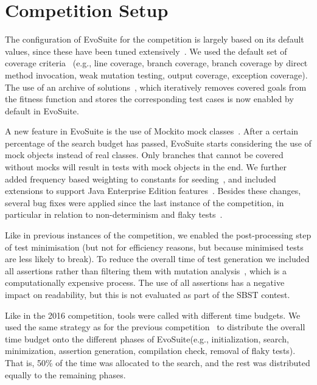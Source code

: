 \documentclass[10pt,conference]{IEEEtran}
\newcommand{\EVOSUITE}{{\sc EvoSuite}\xspace}
\begin{document}
\section{Competition Setup}

The configuration of \EVOSUITE for the competition is largely based on
its default values, since these have been tuned
extensively~\cite{arcuri2013parameter}. We used the default set of
coverage criteria~\cite{rojas2015combining} (e.g., line coverage,
branch coverage, branch coverage by direct method invocation, weak
mutation testing, output coverage, exception coverage). The use of an
archive of solutions~\cite{emse_archive}, which iteratively removes
covered goals from the fitness function and stores the corresponding
test cases is now enabled by default in \EVOSUITE.

A new feature in \EVOSUITE is the use of Mockito mock
classes~\cite{ICST_Mocking17}. After a certain percentage of the
search budget has passed, \EVOSUITE starts considering the use of mock
objects instead of real classes. Only branches that cannot be covered
without mocks will result in tests with mock objects in the end. We
further added frequency based weighting to constants for
seeding~\cite{sakti2015instance}, and included extensions to support
Java Enterprise Edition features~\cite{arcuri2016java}. Besides these
changes, several bug fixes were applied since the last instance of the
competition, in particular in relation to non-determinism and flaky
tests~\cite{ase14_environment}.

Like in previous instances of the competition, we enabled the
post-processing step of test minimisation (but not for efficiency
reasons, but because minimised tests are less likely to break). To
reduce the overall time of test generation we included all assertions
rather than filtering them with mutation
analysis~\cite{10.1109/TSE.2011.93}, which is a computationally
expensive process. The use of all assertions has a negative impact on
readability, but this is not evaluated as part of the SBST contest.

Like in the 2016 competition, tools were called with different time
budgets. We used the same strategy as for the previous
competition~\cite{evosuiteAtSbst2016} to distribute the overall time
budget onto the different phases of \EVOSUITE (e.g., initialization,
search, minimization, assertion generation, compilation check, removal
of flaky tests). That is, 50\% of the time was allocated to the
search, and the rest was distributed equally to the remaining
phases.
\end{document}
